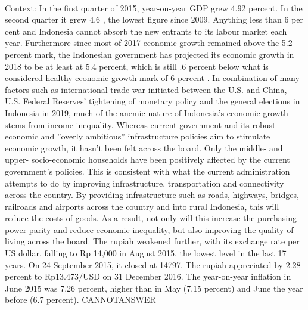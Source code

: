 \documentclass[11pt,a4paper, onecolumn]{article}
\begin{document}
\\ Context: In the first quarter of 2015, year-on-year GDP grew 4.92 percent. In the second quarter it grew 4.6 , the lowest figure since 2009. Anything less than 6 per cent and Indonesia cannot absorb the new entrants to its labour market each year. Furthermore since most of 2017 economic growth remained above the 5.2 percent mark, the Indonesian government has projected its economic growth in 2018 to be at least at 5.4 percent, which is still .6 percent below what is considered healthy economic growth mark of 6 percent . In combination of many factors such as international trade war initiated between the U.S. and China, U.S. Federal Reserves' tightening of monetary policy and the general elections in Indonesia in 2019, much of the anemic nature of Indonesia's economic growth stems from income inequality. Whereas current government and its robust economic and ''overly ambitious'' infrastructure policies aim to stimulate economic growth, it hasn't been felt across the board. Only the middle- and upper- socio-economic households have been positively affected by the current government's policies. This is consistent with what the current administration attempts to do by improving infrastructure, transportation and connectivity across the country. By providing infrastructure such as roads, highways, bridges, railroads and airports across the country and into rural Indonesia, this will reduce the costs of goods. As a result, not only will this increase the purchasing power parity and reduce economic inequality, but also improving the quality of living across the board. The rupiah weakened further, with its exchange rate per US dollar, falling to Rp 14,000 in August 2015, the lowest level in the last 17 years. On 24 September 2015, it closed at 14797. The rupiah appreciated by 2.28 percent to Rp13.473/USD on 31 December 2016. The year-on-year inflation in June 2015 was 7.26 percent, higher than in May (7.15 percent) and June the year before (6.7 percent). CANNOTANSWER
\end{document}
